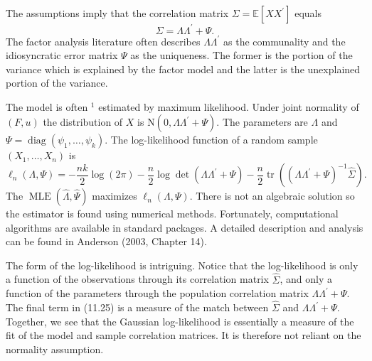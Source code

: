 \documentclass[10pt]{article}
\begin{document}
The assumptions imply that the correlation matrix $\Sigma=\mathbb{E}\left[X X^{\prime}\right]$ equals
$$
\Sigma=\Lambda \Lambda^{\prime}+\Psi .
$$
The factor analysis literature often describes $\Lambda \Lambda^{\prime}$ as the communality and the idiosyncratic error matrix $\Psi$ as the uniqueness. The former is the portion of the variance which is explained by the factor model and the latter is the unexplained portion of the variance.

The model is often ${ }^{1}$ estimated by maximum likelihood. Under joint normality of $(F, u)$ the distribution of $X$ is $\mathrm{N}\left(0, \Lambda \Lambda^{\prime}+\Psi\right)$. The parameters are $\Lambda$ and $\Psi=\operatorname{diag}\left(\psi_{1}, \ldots, \psi_{k}\right)$. The log-likelihood function of a random sample $\left(X_{1}, \ldots, X_{n}\right)$ is
$$
\ell_{n}(\Lambda, \Psi)=-\frac{n k}{2} \log (2 \pi)-\frac{n}{2} \log \operatorname{det}\left(\Lambda \Lambda^{\prime}+\Psi\right)-\frac{n}{2} \operatorname{tr}\left(\left(\Lambda \Lambda^{\prime}+\Psi\right)^{-1} \widehat{\Sigma}\right) .
$$
The $\operatorname{MLE}(\widehat{\Lambda}, \widehat{\Psi})$ maximizes $\ell_{n}(\Lambda, \Psi)$. There is not an algebraic solution so the estimator is found using numerical methods. Fortunately, computational algorithms are available in standard packages. A detailed description and analysis can be found in Anderson (2003, Chapter 14).

The form of the log-likelihood is intriguing. Notice that the log-likelihood is only a function of the observations through its correlation matrix $\widehat{\Sigma}$, and only a function of the parameters through the population correlation matrix $\Lambda \Lambda^{\prime}+\Psi$. The final term in (11.25) is a measure of the match between $\widehat{\Sigma}$ and $\Lambda \Lambda^{\prime}+\Psi$. Together, we see that the Gaussian log-likelihood is essentially a measure of the fit of the model and sample correlation matrices. It is therefore not reliant on the normality assumption.
\end{document}
